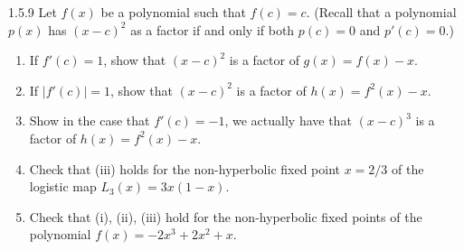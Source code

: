 \begin{problem}{1.5.9}
  Let $f(x)$ be a polynomial such that $f(c) = c$. (Recall that a polynomial
  $p(x)$ has $(x-c)^2$ as a factor if and only if both $p(c) = 0$ and $p'(c) = 0$.)
  \begin{enumerate}
    \item If $f'(c) = 1$, show that $(x-c)^2$ is a factor of $g(x) = f(x) - x$.
    \item If $|f'(c)| = 1$, show that $(x-c)^2$ is a factor of $h(x) = f^2(x) - x$.
    \item Show in the case that $f'(c) = -1$, we actually have that $(x-c)^3$ is a
      factor of $h(x) = f^2(x) - x$.
    \item Check that (iii) holds for the non-hyperbolic fixed point $x=2/3$ of the logistic
      map $L_3(x) = 3x(1-x)$.
    \item Check that (i), (ii), (iii) hold for the non-hyperbolic fixed points
      of the polynomial $f(x) = -2x^3 + 2x^2 + x$.
  \end{enumerate}
\end{problem}


